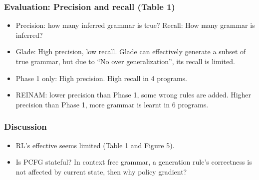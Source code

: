 \begin{frame}
	\frametitle{Evaluation: Precision and recall (Table 1)}
	\begin{itemize}
		\item Precision: how many inferred grammar is true? Recall: How many grammar is inferred?
		\item Glade: High precision, low recall. Glade can effectively generate a subset of true grammar, but due to ``No over generalization'', its recall is limited.
		\item Phase 1 only: High precision. High recall in 4 programs.
		\item REINAM: lower precision than Phase 1, some wrong rules are added. Higher precision than Phase 1, more grammar is learnt in 6 programs.
	\end{itemize}
\end{frame}

\begin{frame}
	\frametitle{Discussion}
	\begin{itemize}
		\item RL's effective seems limited (Table 1 and Figure 5).
		\item Is PCFG stateful? In context free grammar, a generation rule's correctness is not affected by current state, then why policy gradient?
	\end{itemize}
\end{frame}